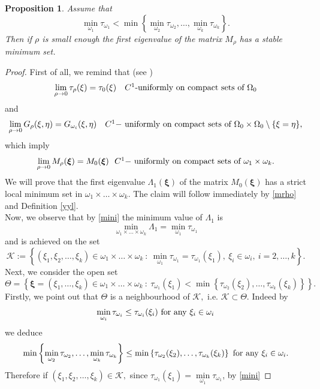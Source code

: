 \documentclass[11pt,a4paper]{amsart}
\newtheorem{proposition}[theorem]{Proposition}
\theoremstyle{definition}
\renewcommand{\(}{\left(}
\renewcommand{\)}{\right)}
\begin{document}
\begin{proposition}
Assume that 
\begin{equation}\label{mini} \min\limits_{\omega_1}\tau_{\omega_1}<\min\left\{\min\limits_{\omega_2}\tau_{\omega_2},\dots,\min\limits_{\omega_{k}}\tau_{\omega_k}\right\}.\end{equation}
Then if $\rho$ is small enough the first eigenvalue of the matrix $M_\rho$ has a stable minimum set.
\end{proposition}
\begin{proof}
First of all, we remind that (see  \cite[Lemma 3.2]{MP})
$$\lim_{\rho \to 0} \tau_{\rho}(\xi)= \tau_{0}(\xi)\quad \hbox{$C^1$-uniformly on compact sets of $\Omega_0$}
$$
and
$$\lim_{\rho \to 0} G_{\rho}(\xi,\eta) = G_{\omega_i}(\xi,\eta)\quad \hbox{$C^1-$ uniformly on compact sets of $\Omega_0\times\Omega_0\setminus\{\xi=\eta\},$}
$$
which imply  
\begin{equation}\label{mrho}\lim\limits_{\rho\to0} M_\rho(\boldsymbol\xi)=M_0 (\boldsymbol\xi)\ \hbox{
$C^1-$ uniformly on compact sets of $\omega_1\times\omega_k$.}\end{equation}
We will prove that the first eigenvalue $\Lambda_1(\boldsymbol\xi)$ of the matrix $M_0(\boldsymbol\xi)$ has a strict local minimum set in $\omega_1\times\dots\times\omega_k$. The claim will follow immediately by \eqref{mrho} and Definition \ref{yyl}.\\
Now, we observe that by \eqref{mini} the minimum value of $\Lambda_1$ is
$$\min\limits_{ \omega_1\times\dots\times\omega_k} \Lambda_1 =\min\limits_{\omega_1}\tau_{\omega_1}$$
and 
 is achieved on the set 
 $$\mathscr K:=\left\{(\xi_1,\xi_2,\dots,\xi_k)\in \omega_1\times\dots\times\omega_k\  :\ \min\limits_{\omega_1}\tau_{\omega_1}=\tau_{\omega_1}(\xi_1),\ \xi_i\in\omega_i,\ i=2,\dots,k\right\}.$$
Next,
we consider the open set
$$\Theta=\left\{\boldsymbol\xi=(\xi_1,\dots,\xi_k)\in \omega_1\times\dots\times\omega_k\ :\ \tau_{\omega_1}(\xi_1)<
\min\left\{\tau_{\omega_2}(\xi_2),\dots,\tau_{\omega_k}(\xi_k)\right\} \right\}.$$
Firstly, we point out that $\Theta$ is a neighbourhood of $\mathscr K,$ i.e. $\mathscr K\subset \Theta$. Indeed by 
$$\min\limits_{\omega_{i}}\tau_{\omega_i}\leq \tau_{\omega_i}(\xi_i)\ \hbox{for any}\ \xi_i\in\omega_i$$
we deduce
$$\min\left\{\min\limits_{\omega_2}\tau_{\omega_2},\dots,\min\limits_{\omega_{k}}\tau_{\omega_k}\right\}\leq \min\left\{\tau_{\omega_2}(\xi_2),\dots,\tau_{\omega_k}(\xi_k)\right\}\ \hbox{for any}\ \xi_i\in\omega_i.$$
Therefore if $(\xi_1,\xi_2,\dots,\xi_k)\in \mathscr K,$  since  $\tau_{\omega_1}(\xi_1)=\min\limits_{\omega_1}\tau_{\omega_1}$, by \eqref{mini}

\end{proof}
\end{document}
